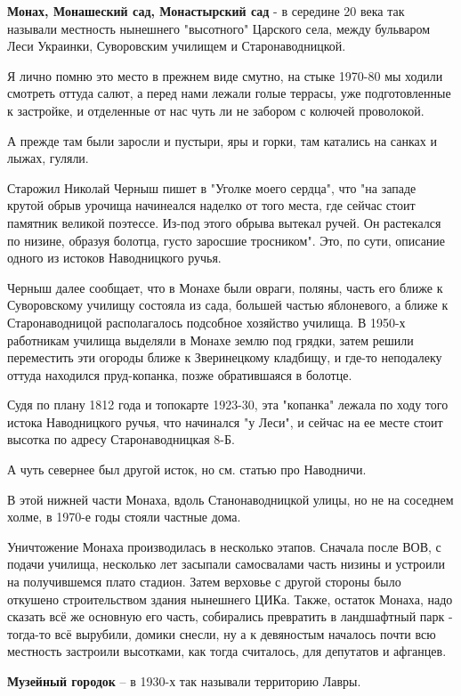 \textbf{Монах, Монашеский сад, Монастырский сад} - в середине 20 века так называли местность нынешнего "высотного" Царского села, между бульваром Леси Украинки, Суворовским училищем и Старонаводницкой. 

Я лично помню это место в прежнем виде смутно, на стыке 1970-80 мы ходили смотреть оттуда салют, а перед нами лежали голые террасы, уже подготовленные к застройке, и отделенные от нас чуть ли не забором с колючей проволокой.

А прежде там были заросли и пустыри, яры и горки, там катались на санках и лыжах, гуляли.

Старожил Николай Черныш пишет в "Уголке моего сердца", что "на западе крутой обрыв урочища начинеался наделко от того места, где сейчас стоит памятник великой поэтессе. Из-под этого обрыва вытекал ручей. Он растекался по низине, образуя болотца, густо заросшие тросником". Это, по сути, описание одного из истоков Наводницкого ручья.

Черныш далее сообщает, что в Монахе были овраги, поляны, часть его ближе к Суворовскому училищу состояла из сада, большей частью яблоневого, а ближе к Старонаводницой располагалось подсобное хозяйство училища. В 1950-х работникам училища выделяли в Монахе землю под грядки, затем решили переместить эти огороды ближе к Зверинецкому кладбищу, и где-то неподалеку оттуда находился пруд-копанка, позже обратившаяся в болотце. 

Судя по плану 1812 года и топокарте 1923-30, эта "копанка" лежала по ходу того истока Наводницкого ручья, что начинался "у Леси", и сейчас на ее месте стоит высотка по адресу Старонаводницкая 8-Б. 

А чуть севернее был другой исток, но см. статью про Наводничи.

В этой нижней части Монаха, вдоль Станонаводницкой улицы, но не на соседнем холме, в 1970-е годы стояли частные дома. 

Уничтожение Монаха производилась в несколько этапов. Сначала после ВОВ, с подачи училища, несколько лет засыпали самосвалами часть низины и устроили на получившемся плато стадион. Затем верховье с другой стороны было откушено строительством здания нынешнего ЦИКа. Также, остаток Монаха, надо сказать всё же основную его часть, собирались превратить в ландшафтный парк - тогда-то всё вырубили, домики снесли, ну а к девяностым началось почти всю местность застроили высотками, как тогда считалось, для депутатов и афганцев.

\medskip


\textbf{Музейный городок} – в 1930-х так называли территорию Лавры.\\

